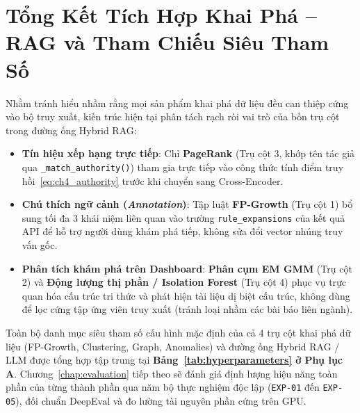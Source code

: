 \FloatBarrier
\section{Tổng Kết Tích Hợp Khai Phá -- RAG và Tham Chiếu Siêu Tham Số}
\label{sec:mining_rag_integration}

Nhằm tránh hiểu nhầm rằng mọi sản phẩm khai phá dữ liệu đều can thiệp cứng vào bộ truy xuất, kiến trúc hiện tại phân tách rạch ròi vai trò của bốn trụ cột trong đường ống Hybrid RAG:
\begin{itemize}
  \item \textbf{Tín hiệu xếp hạng trực tiếp}: Chỉ \textbf{PageRank} (Trụ cột 3, khớp tên tác giả qua \texttt{\_match\_authority()}) tham gia trực tiếp vào công thức tính điểm truy hồi~\eqref{eq:ch4_authority} trước khi chuyển sang Cross-Encoder.
  \item \textbf{Chú thích ngữ cảnh (\textit{Annotation})}: Tập luật \textbf{FP-Growth} (Trụ cột 1) bổ sung tối đa 3 khái niệm liên quan vào trường \texttt{rule\_expansions} của kết quả API để hỗ trợ người dùng khám phá tiếp, không sửa đổi vector nhúng truy vấn gốc.
  \item \textbf{Phân tích khám phá trên Dashboard}: \textbf{Phân cụm EM GMM} (Trụ cột 2) và \textbf{Động lượng thị phần / Isolation Forest} (Trụ cột 4) phục vụ trực quan hóa cấu trúc tri thức và phát hiện tài liệu dị biệt cấu trúc, không dùng để lọc cứng tập ứng viên truy xuất (tránh loại nhầm các bài báo liên ngành).
\end{itemize}

Toàn bộ danh mục siêu tham số cấu hình mặc định của cả 4 trụ cột khai phá dữ liệu (FP-Growth, Clustering, Graph, Anomalies) và đường ống Hybrid RAG / LLM được tổng hợp tập trung tại \textbf{Bảng~\ref{tab:hyperparameters} ở Phụ lục A}. Chương~\ref{chap:evaluation} tiếp theo sẽ đánh giá định lượng hiệu năng toàn phần của từng thành phần qua năm bộ thực nghiệm độc lập (\texttt{EXP-01} đến \texttt{EXP-05}), đối chuẩn DeepEval và đo lường tài nguyên phần cứng trên GPU.
